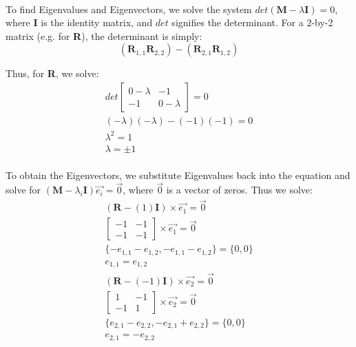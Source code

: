 \documentclass[12pt]{article}
\begin{document}
\paragraph{} To find Eigenvalues and Eigenvectors, we solve the system $det(\textbf{M}-\lambda\textbf{I})=0$, where \textbf{I} is the identity matrix, and $det$ signifies the determinant. For a 2-by-2 matrix (e.g. for \textbf{R}), the determinant is simply:
\begin{equation}
(\textbf{R}_{1,1} \textbf{R}_{2,2}) - (\textbf{R}_{2,1} \textbf{R}_{1,2})
\end{equation}

Thus, for \textbf{R}, we solve:
\begin{equation}
\begin{split}
det
\begin{bmatrix}
0-\lambda & -1 \\
-1 & 0-\lambda
\end{bmatrix}
= 0\\
(-\lambda)(-\lambda) - (-1)(-1) = 0\\
\lambda^{2} = 1\\
\lambda = \pm1\\
\end{split}
\end{equation}

To obtain the Eigenvectors, we substitute Eigenvalues back into the equation and solve for $(\textbf{M}-\lambda_{i}\textbf{I})\overrightarrow{e_{i}} = \overrightarrow{0}$, where $\overrightarrow{0}$ is a vector of zeros. Thus we solve:
\begin{equation}
\begin{split}
(\textbf{R}-(1)\textbf{I})\times\overrightarrow{e_{1}} = \overrightarrow{0}\\
\begin{bmatrix}
-1 & -1 \\
-1 & -1
\end{bmatrix}
\times\overrightarrow{e_{1}} = \overrightarrow{0}\\
\{-e_{1,1}-e_{1,2}, -e_{1,1}-e_{1,2}\} = \{0,0\}\\
e_{1,1}=e_{1,2}\\
(\textbf{R}-(-1)\textbf{I})\times\overrightarrow{e_{2}} = \overrightarrow{0}\\
\begin{bmatrix}
1 & -1 \\
-1 & 1
\end{bmatrix}
\times\overrightarrow{e_{2}} = \overrightarrow{0}\\
\{e_{2,1}-e_{2,2}, -e_{2,1}+e_{2,2}\} = \{0,0\}\\
e_{2,1}=-e_{2,2}\\
\end{split}
\end{equation}
\end{document}
